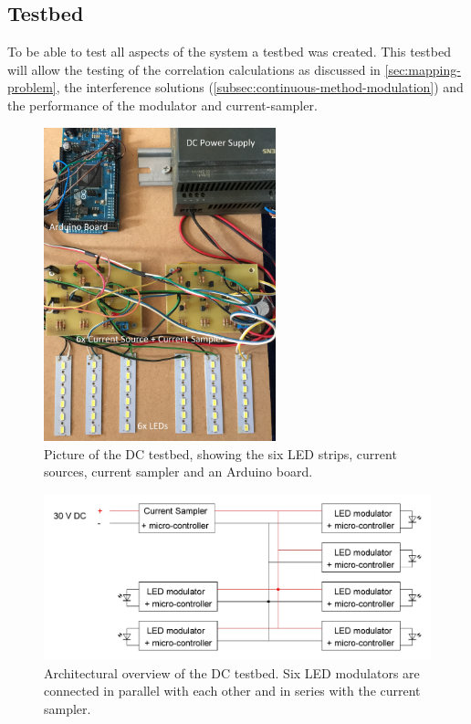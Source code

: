 
\subsection{Testbed}
	\label{subsec:dc-testbed}

	To be able to test all aspects of the system a testbed was created.
	This testbed will allow the testing of the correlation calculations as discussed in \autoref{sec:mapping-problem}, the interference solutions (\autoref{subsec:continuous-method-modulation}) and the performance of the modulator and current-sampler.


	\begin{figure}
		\centering
		\includegraphics[angle=0,width=0.6\textwidth,height=.9\textheight,keepaspectratio]{chapters/hardware-chapters/DC/dc-test-bed/dc-test-bed-picture.JPG}
		\caption{Picture of the DC testbed, showing the six LED strips, current sources, current sampler and an Arduino board.}
		\label{fig:dc-test-bed-picture}
	\end{figure}

	\begin{figure}
		\centering
		\includegraphics[angle=0,width=1.0\textwidth,keepaspectratio]{chapters/hardware-chapters/DC/dc-test-bed/dc-test-bed-architectural.JPG}
		\caption{Architectural overview of the DC testbed. Six LED modulators are connected in parallel with each other and in series with the current sampler.}
		\label{fig:dc-test-bed-architectural}
	\end{figure}


